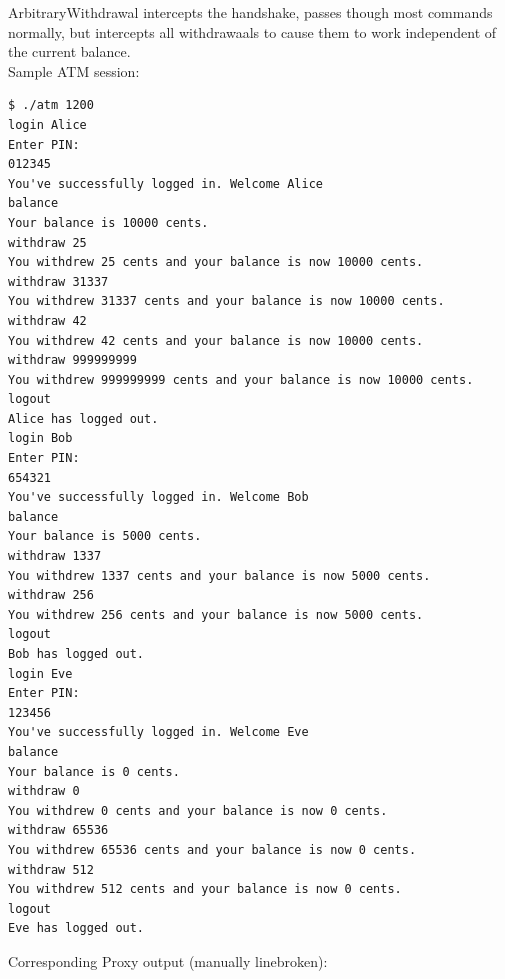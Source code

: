 \documentclass[12pt]{article}
\begin{document}
ArbitraryWithdrawal intercepts the handshake, passes though most commands normally, but intercepts all withdrawaals to cause them to work independent of the current balance.
\\
Sample ATM session:
\begin{Verbatim}[frame=single,fontsize=\scriptsize]
$ ./atm 1200
login Alice
Enter PIN:
012345
You've successfully logged in. Welcome Alice
balance
Your balance is 10000 cents.
withdraw 25
You withdrew 25 cents and your balance is now 10000 cents.
withdraw 31337
You withdrew 31337 cents and your balance is now 10000 cents.
withdraw 42
You withdrew 42 cents and your balance is now 10000 cents.
withdraw 999999999
You withdrew 999999999 cents and your balance is now 10000 cents.
logout
Alice has logged out.
login Bob
Enter PIN:
654321
You've successfully logged in. Welcome Bob
balance
Your balance is 5000 cents.
withdraw 1337
You withdrew 1337 cents and your balance is now 5000 cents.
withdraw 256
You withdrew 256 cents and your balance is now 5000 cents.
logout
Bob has logged out.
login Eve
Enter PIN:
123456
You've successfully logged in. Welcome Eve
balance
Your balance is 0 cents.
withdraw 0
You withdrew 0 cents and your balance is now 0 cents.
withdraw 65536
You withdrew 65536 cents and your balance is now 0 cents.
withdraw 512
You withdrew 512 cents and your balance is now 0 cents.
logout
Eve has logged out.
\end{Verbatim}
Corresponding Proxy output (manually linebroken):
\end{document}
